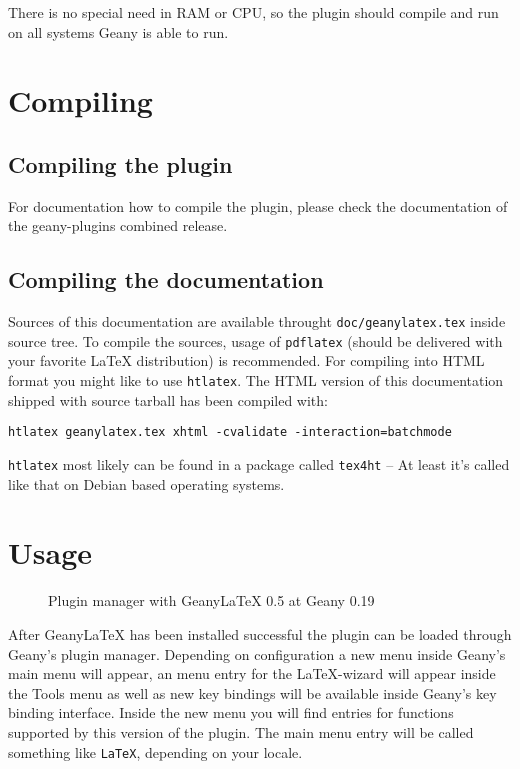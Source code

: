 \documentclass[%
paper=a4,%
fontsize=11pt,%
twoside=false,%
DIV18,%
headsepline,%
plainheadsepline,%
footsepline,%
plainfootsepline,%
bibliography=totoc,%
listof=totoc,%
BCOR10mm,%
parskip=half,%
openany,%
]{scrartcl}
\begin{document}
There is no special need in RAM or CPU, so the plugin should compile
and run on all systems Geany is able to run.

\section{Compiling}
\subsection{Compiling the plugin}
For documentation how to compile the plugin, please check the
documentation of the geany-plugins combined release.
\subsection{Compiling the documentation}
\label{sec:compiling_of_documentation}
Sources of this documentation are available throught
\texttt{doc/geanylatex.tex} inside source tree. To compile the sources,
usage of \texttt{pdflatex} (should be delivered with your favorite
\LaTeX{} distribution) is recommended. For compiling into HTML format you
might like to use \texttt{htlatex}. The HTML version of this documentation
shipped with source tarball has been compiled with:

\begin{lstlisting}[caption={Compiling of documentation}]
htlatex geanylatex.tex xhtml -cvalidate -interaction=batchmode
\end{lstlisting}

\texttt{htlatex} most likely can be found in a package called \texttt{tex4ht}
-- At least it's called like that on Debian based operating
systems.

\section{Usage}
\begin{figure}[h!]
	\caption{Plugin manager with Geany\LaTeX{} 0.5 at Geany 0.19}
\end{figure}

After Geany\LaTeX{} has been installed successful the plugin can be
loaded through Geany's plugin manager. Depending on configuration a
new menu inside Geany's main menu will appear, an menu entry for the
\LaTeX{}-wizard will appear inside the Tools menu as well as new key
bindings will be available inside Geany's key binding interface.
Inside the new menu you will find entries for functions supported by
this version of the plugin. The main menu entry will be called
something like \texttt{LaTeX}, depending on your locale.
\end{document}
